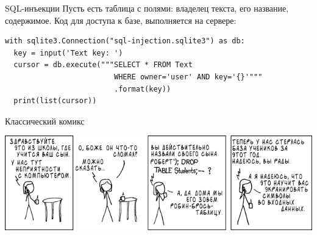 \begin{frame}[t,fragile]{SQL-инъекции}
	Пусть есть таблица с полями: владелец текста, его название, содержимое.
	Код для доступа к базе, выполняется на сервере:
\begin{verbatim}
with sqlite3.Connection("sql-injection.sqlite3") as db:
  key = input('Text key: ')
  cursor = db.execute("""SELECT * FROM Text
                         WHERE owner='user' AND key='{}'"""
                         .format(key))
  print(list(cursor))
\end{verbatim}
\end{frame}

\begin{frame}{Классический комикс}
	\begin{center}
		\includegraphics[scale=0.5]{xkcd-327.png}
	\end{center}
\end{frame}

